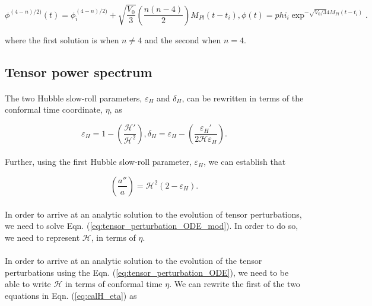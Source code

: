 \documentclass[12pt,a4paper,oneside]{book}
\begin{document}
\begin{equation}
\phi^{(4-n)/2)}(t) = \phi^{(4-n)/2)}_i + \sqrt{\frac{V_0}{3}}\left(\frac{n(n-4)}{2}\right)M_{Pl}(t-t_i),
\phi(t) = phi_i\exp^{-\sqrt{V_0/3}4M_{Pl}(t-t_i)}.
\end{equation}

\noindent where the first solution is when $n \neq 4$ and the second when $n = 4$.

\subsection{Tensor power spectrum}

\paragraph*{} The two Hubble slow-roll parameters, $\varepsilon_H$ and $\delta_H$,  
can be rewritten in terms of the conformal time coordinate, $\eta$, as 

\begin{equation}\label{eq:calH_eta}
\varepsilon_H = 1-\left(\frac{\mathcal{H'}}{\mathcal{H}^2}\right),
\delta_H = \varepsilon_H - \left(\frac{\varepsilon_H'}{2\mathcal{H}\varepsilon_H}\right).
\end{equation}

\paragraph*{} Further, using the first Hubble slow-roll parameter, $\varepsilon_H$, 
we can establish that

\begin{equation}\label{eq:a''/a}
\left(\frac{a''}{a}\right) = \mathcal{H}^2(2-\varepsilon_H).
\end{equation}

\paragraph*{} In order to arrive at an analytic solution to the evolution 
of tensor perturbations, we need to solve Eqn. (\ref{eq:tensor_perturbation_ODE_mod}). 
In order to do so, we need to represent $\mathcal{H}$, in terms of $\eta$.

\paragraph*{} In order to arrive at an analytic solution to the evolution of the 
tensor perturbations using the Eqn. (\ref{eq:tensor_perturbation_ODE}), 
we need to be able to write $\mathcal{H}$ in terms of conformal time $\eta$. 
We can rewrite the first of the two equations in Eqn. (\ref{eq:calH_eta}) as 
\end{document}
